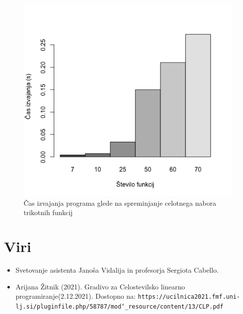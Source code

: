 \documentclass[11pt]{article}
\theoremstyle{definition}
\newcommand{\1}{\mathbbm{1}}
\begin{document}
\begin{figure}[h!]
	\centering
	\includegraphics[scale=0.55]{casi.png}
	\caption{Čas izvajanja programa glede na spreminjanje celotnega nabora trikotnih funkcij}
\end{figure}



\newpage{}
\section{Viri}
\begin{itemize}
\item Svetovanje asistenta Janoša Vidalija in profesorja Sergiota Cabello.
\item Arijana Žitnik (2021). Gradivo za Celostevilsko linearno programiranje(2.12.2021). Dostopno na:
\texttt{https://ucilnica2021.fmf.uni-lj.si/pluginfile.php/58787/mod\char`_resource/content/13/CLP.pdf}

\end{itemize}
\end{document}
